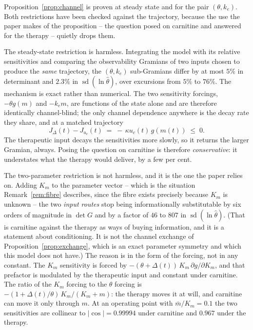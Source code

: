 \begin{remark}
\label{rem:channel_scope}
Proposition~\ref{prop:channel} is proven at steady state and for the pair $(\theta, k_e)$.
Both restrictions have been checked against the trajectory, because the use the paper makes
of the proposition -- the question posed on carnitine and answered for the therapy --
quietly drops them.

The steady-state restriction is harmless. Integrating the model with its relative
sensitivities and comparing the observability Gramians of two inputs chosen to produce the
\emph{same} trajectory, the $(\theta, k_e)$ sub-Gramians differ by at most $5\%$ in
determinant and $2.3\%$ in $\operatorname{sd}(\ln\hat\theta)$, over excursions from $5\%$ to
$76\%$. The mechanism is exact rather than numerical. The two sensitivity forcings,
$-\theta g(m)$ and $-k_e m$, are functions of the state alone and are therefore identically
channel-blind; the only channel dependence anywhere is the decay rate they share, and at a
matched trajectory
\begin{equation}
J_{\Delta}(t) - J_{u_c}(t) \;=\; -\,\kappa u_c(t)\, g(m(t)) \;\le\; 0.
\label{eq:jgap}
\end{equation}
The therapeutic input decays the sensitivities more slowly, so it returns the larger
Gramian, always. Posing the question on carnitine is therefore \emph{conservative}: it
understates what the therapy would deliver, by a few per cent.

The two-parameter restriction is not harmless, and it is the one the paper relies
on. Adding $K_m$ to the parameter vector -- which is the situation Remark~\ref{rem:fibre}
describes, since the fibre exists precisely because $K_m$ is unknown -- the two \emph{input
routes} stop being informationally substitutable by six orders of magnitude in $\det G$ and
by a factor of $46$ to $807$ in $\operatorname{sd}(\ln\hat\theta)$. (That is carnitine
against the therapy as ways of buying information, and it is a statement about
conditioning. It is not the channel exchange of Proposition~\ref{prop:exchange}, which is
an exact parameter symmetry and which this model does not have.) The reason is in the form of the forcing, not
in any constant. The $K_m$ sensitivity
is forced by $-(\theta + \Delta(t))\,K_m\,\partial g/\partial K_m$, and that prefactor is
modulated by the therapeutic input and constant under carnitine. The ratio of the $K_m$
forcing to the $\theta$ forcing is $-(1 + \Delta(t)/\theta)\,K_m/(K_m + m)$: the therapy
moves it at will, and carnitine can move it only through $m$. At an operating point with
$\bar m/K_m = 0.1$ the two sensitivities are collinear to $|\!\cos| = 0.99994$ under
carnitine and $0.967$ under the therapy.


\end{remark}
